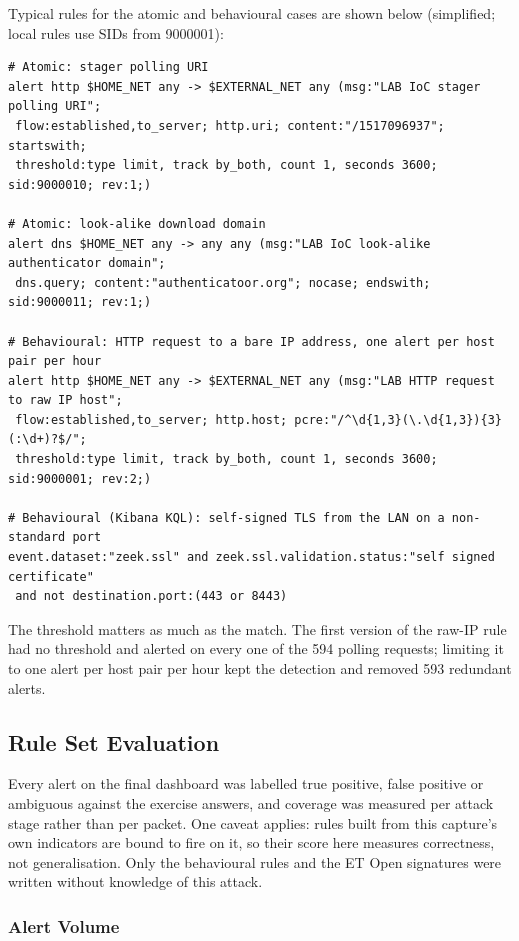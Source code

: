 Typical rules for the atomic and behavioural cases are shown below (simplified; local rules use SIDs from 9000001):

\begin{lstlisting}
# Atomic: stager polling URI
alert http $HOME_NET any -> $EXTERNAL_NET any (msg:"LAB IoC stager polling URI";
 flow:established,to_server; http.uri; content:"/1517096937"; startswith;
 threshold:type limit, track by_both, count 1, seconds 3600; sid:9000010; rev:1;)

# Atomic: look-alike download domain
alert dns $HOME_NET any -> any any (msg:"LAB IoC look-alike authenticator domain";
 dns.query; content:"authenticatoor.org"; nocase; endswith; sid:9000011; rev:1;)

# Behavioural: HTTP request to a bare IP address, one alert per host pair per hour
alert http $HOME_NET any -> $EXTERNAL_NET any (msg:"LAB HTTP request to raw IP host";
 flow:established,to_server; http.host; pcre:"/^\d{1,3}(\.\d{1,3}){3}(:\d+)?$/";
 threshold:type limit, track by_both, count 1, seconds 3600; sid:9000001; rev:2;)

# Behavioural (Kibana KQL): self-signed TLS from the LAN on a non-standard port
event.dataset:"zeek.ssl" and zeek.ssl.validation.status:"self signed certificate"
 and not destination.port:(443 or 8443)
\end{lstlisting}

The threshold matters as much as the match. The first version of the raw-IP rule had no threshold and alerted on every one of the 594 polling requests; limiting it to one alert per host pair per hour kept the detection and removed 593 redundant alerts.

\subsection{Rule Set Evaluation}

Every alert on the final dashboard was labelled true positive, false positive or ambiguous against the exercise answers, and coverage was measured per attack stage rather than per packet. One caveat applies: rules built from this capture's own indicators are bound to fire on it, so their score here measures correctness, not generalisation. Only the behavioural rules and the ET Open signatures were written without knowledge of this attack.

\subsubsection{Alert Volume}


